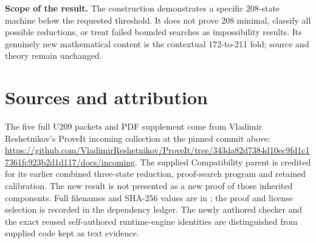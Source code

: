 \documentclass[11pt,letterpaper]{article}
\begin{document}
\textbf{Scope of the result.} The construction demonstrates a specific
208-state machine below the requested threshold. It does not prove
208 minimal, classify all possible reductions, or treat failed bounded
searches as impossibility results. Its genuinely new mathematical
content is the contextual 172-to-211 fold; source and theory remain
unchanged.

\section*{Sources and attribution}
The five full U209 packets and PDF supplement come from Vladimir
Reshetnikov's ProveIt incoming collection at the pinned commit above:
\url{https://github.com/VladimirReshetnikov/ProveIt/tree/343da82d7384d10ec9fd1c17361fc923b2d1d117/docs/incoming}.
The supplied Compatibility parent is credited for its earlier combined
three-state reduction, proof-search program and retained calibration.
The new result is not presented as a new proof of those inherited
components. Full filenames and SHA-256 values are in
; the proof and license selection is recorded
in the dependency ledger. The newly authored checker and the exact
reused self-authored runtime-engine identities are distinguished from
supplied code kept as text evidence.

\appendix

\end{document}
